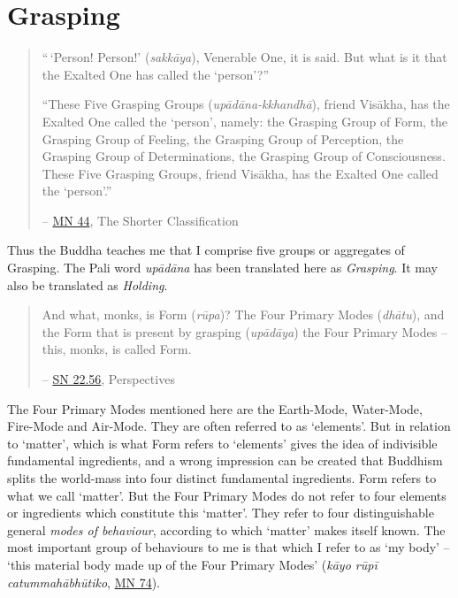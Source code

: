 \chapter{Grasping}

\begin{quote}
``\,`Person! Person!' (\textit{sakkāya}), Venerable One, it is said. But what is it that the Exalted One has called the `person'?''

``These Five Grasping Groups (\textit{upādāna-kkhandhā}), friend Visākha, has the Exalted One called the `person', namely: the Grasping Group of Form, the Grasping Group of Feeling, the Grasping Group of Perception, the Grasping Group of Determinations, the Grasping Group of Consciousness. These Five Grasping Groups, friend Visākha, has the Exalted One called the `person'.''

 -- \href{https://suttacentral.net/mn44/en/sujato}{MN 44}, The Shorter Classification
\end{quote}

Thus the Buddha teaches me that I comprise five groups or aggregates of Grasping. The Pali word \textit{upādāna} has been translated here as \textit{Grasping}. It may also be translated as \textit{Holding}.

\begin{quote}
And what, monks, is Form (\textit{rūpa})? The Four Primary Modes (\textit{dhātu}), and the Form that is present by grasping (\textit{upādāya}) the Four Primary Modes -- this, monks, is called Form.

 -- \href{https://suttacentral.net/sn22.56/en/bodhi}{SN 22.56}, Perspectives
\end{quote}

The Four Primary Modes mentioned here are the Earth-Mode, Water-Mode, Fire-Mode and Air-Mode. They are often referred to as `elements'. But in relation to `matter', which is what Form refers to `elements' gives the idea of indivisible fundamental ingredients, and a wrong impression can be created that Buddhism splits the world-mass into four distinct fundamental ingredients. Form refers to what we call `matter'. But the Four Primary Modes do not refer to four elements or ingredients which constitute this `matter'. They refer to four distinguishable general \emph{modes of behaviour}, according to which `matter' makes itself known. The most important group of behaviours to me is that which I refer to as `my body' -- `this material body made up of the Four Primary Modes' (\textit{kāyo rūpī catummahābhūtiko}, \href{https://suttacentral.net/mn74/en/sujato}{MN 74}).


